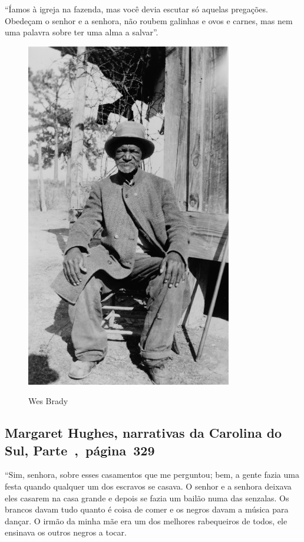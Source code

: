 ``Íamos à igreja na fazenda, mas você devia escutar só aquelas
pregações. Obedeçam o senhor e a senhora, não roubem galinhas e ovos e
carnes, mas nem uma palavra sobre ter uma alma a salvar''.

\pagebreak
\thispagestyle{empty}
\begin{figure}[!ht]
\centering
 \includegraphics[width=90mm]{./imgs/wesbrady_recorte.jpg} \label{img15}
\caption{Wes Brady}
\end{figure}

\subsection{Margaret Hughes, narrativas da Carolina do Sul, Parte~,~página~329}
\label{ref154}

``Sim, senhora, sobre esses casamentos que me perguntou; bem, a gente
fazia uma festa quando qualquer um dos escravos se casava. O senhor e a
senhora deixava eles casarem na casa grande e depois se fazia um bailão
numa das senzalas. Os brancos davam tudo quanto é coisa de comer e os
negros davam a música para dançar. O irmão da minha mãe era um dos
melhores rabequeiros de todos, ele ensinava os outros negros a tocar.

